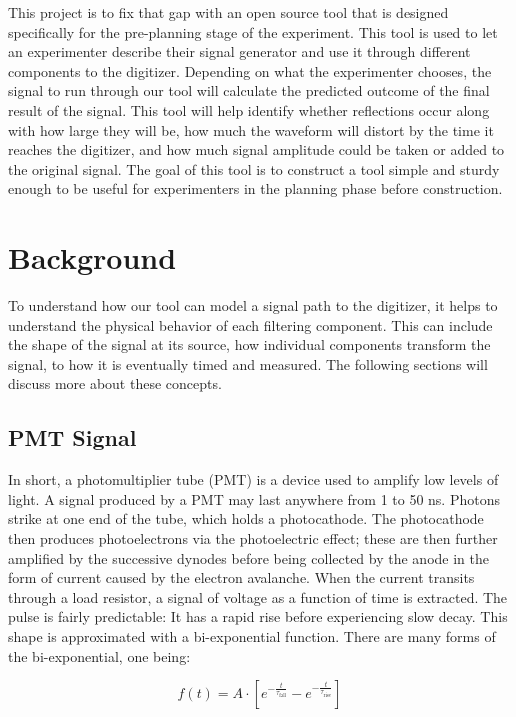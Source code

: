 \documentclass[10pt]{article}
\begin{document}
This project is to fix that gap with an open source tool that is designed specifically for the pre-planning stage of the experiment. This tool is used to let an experimenter describe their signal generator and use it through different components to the digitizer. Depending on what the experimenter chooses, the signal to run through our tool will calculate the predicted outcome of the final result of the signal. This tool will help identify whether reflections occur along with how large they will be, how much the waveform will distort by the time it reaches the digitizer, and how much signal amplitude could be taken or added to the original signal. The goal of this tool is to construct a tool simple and sturdy enough to be useful for experimenters in the planning phase before construction.
\section{Background}

To understand how our tool can model a signal path to the digitizer, it helps to understand the physical behavior of each filtering component. This can include the shape of the signal at its source, how individual components transform the signal, to how it is eventually timed and measured. The following sections will discuss more about these concepts.

\subsection{PMT Signal}
In short, a photomultiplier tube (PMT) is a device used to amplify low levels of light. A signal produced by a PMT may last anywhere from 1 to 50 ns. Photons strike at one end of the tube, which holds a photocathode. The photocathode then produces photoelectrons via the photoelectric effect; these are then further amplified by the successive dynodes before being collected by the anode in the form of current caused by the electron avalanche. When the current transits through a load resistor, a signal of voltage as a function of time is extracted. The pulse is fairly predictable: It has a rapid rise before experiencing slow decay. This shape is approximated with a bi-exponential function. There are many forms of the bi-exponential, one being:

$$
f(t) = A \cdot \left[ e^{-\frac{t}{\tau_{\text{fall}}}} - e^{-\frac{t}{\tau_{\text{rise}}}} \right]
$$
\end{document}
